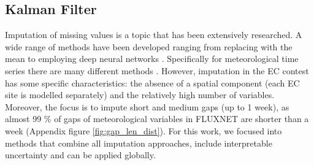 \documentclass{article}
\let\Oldsubsection\subsection
\renewcommand{\subsection}{\FloatBarrier\Oldsubsection}
\begin{document}
\subsection{Kalman Filter}
Imputation of missing values is a topic that has been extensively researched. A wide range of methods have been developed ranging from replacing with the mean to employing deep neural networks \cite{fang_time_2020-1, buuren_mice_2011, du_saits_2022-1, zhang_dual-head_2021-2, cao_brits_nodate}. Specifically for meteorological time series there are many different methods \cite{costa_gap_2021, jing_multi-imputation_2022}. However, imputation in the EC contest has some specific characteristics: the absence of a spatial component (each EC site is modelled separately) and the relatively high number of variables. Moreover, the focus is to impute short and medium gaps (up to 1 week), as almost 99 \% of gaps of meteorological variables in FLUXNET are shorter than a week (Appendix figure \ref{fig:gap_len_dist}). For this work, we focused into methods that combine all imputation approaches, include interpretable uncertainty and can be applied globally. 
\end{document}

